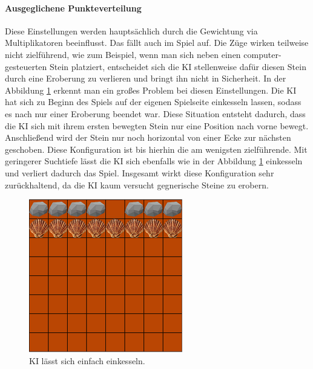 \paragraph{Ausgeglichene Punkteverteilung}
Diese Einstellungen werden hauptsächlich durch die Gewichtung via Multiplikatoren beeinflusst. Das fällt auch im Spiel auf. Die Züge wirken teilweise nicht zielführend, wie zum Beispiel, wenn man sich neben einen computer-gesteuerten Stein platziert, entscheidet sich die KI stellenweise dafür diesen Stein durch eine Eroberung zu verlieren und bringt ihn nicht in Sicherheit. In der Abbildung \ref{fig:humaneingekesselt} erkennt man ein großes Problem bei diesen Einstellungen. Die KI hat sich zu Beginn des Spiels auf der eigenen Spielseite einkesseln lassen, sodass es nach nur einer Eroberung beendet war. Diese Situation entsteht dadurch, dass die KI sich mit ihrem ersten bewegten Stein nur eine Position nach vorne bewegt. Anschließend wird der Stein nur noch horizontal von einer Ecke zur nächsten geschoben. Diese Konfiguration ist bis hierhin die am wenigsten zielführende. Mit geringerer Suchtiefe lässt die KI sich ebenfalls wie in der Abbildung \ref{fig:humaneingekesselt} einkesseln und verliert dadurch das Spiel. Insgesamt wirkt diese Konfiguration sehr zurückhaltend, da die KI kaum versucht gegnerische Steine zu erobern.
\begin{figure}[h]
	\centering
	\includegraphics{img/both/humaneingekesselt}	
	\caption{KI lässt sich einfach einkesseln.}
	\label{fig:humaneingekesselt}
\end{figure}




